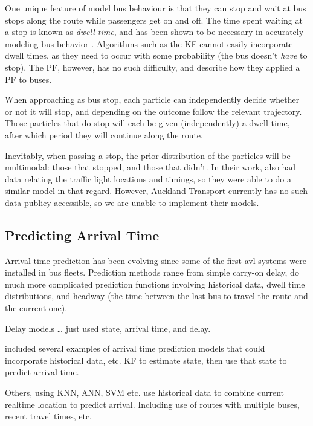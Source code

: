 \documentclass[12pt,a4paper]{article}
\begin{document}
One unique feature of model bus behaviour is that they can stop and wait at bus stops along the route
while passengers get on and off.
The time spent waiting at a stop is known as \emph{dwell time},
and has been shown to be necessary in accurately modeling bus behavior \citep{cn}.
Algorithms such as the KF cannot easily incorporate dwell times,
as they need to occur with some probability (the bus doesn't \emph{have} to stop).
The PF, however, has no such difficulty,
and \cite{hans-etal:2015} describe how they applied a PF to buses.


When approaching as bus stop,
each particle can independently decide whether or not it will stop,
and depending on the outcome follow the relevant trajectory.
Those particles that do stop will each be given (independently)
a dwell time, after which period they will continue along the route.

Inevitably, when passing a stop, the prior distribution of the particles will be multimodal:
those that stopped, and those that didn't.
In their work, \cite{hans-etal:2015} also had data relating the traffic light locations and
timings, so they were able to do a similar model in that regard.
However, Auckland Transport currently has no such data publicy accessible,
so we are unable to implement their models.



\subsection{Predicting Arrival Time}
\label{sec:arrivaltimeprediction}

Arrival time prediction has been evolving since some of the first \gls{avl}
systems were installed in bus fleets.
Prediction methods range from simple carry-on delay,
do much more complicated prediction functions involving historical data,
dwell time distributions, 
and headway (the time between the last bus to travel the route and the current one).


Delay models \ldots
\cite{dailey:2001} just used state, arrival time, and delay.


\cite{cathey-dailey:2003} included several examples of arrival time prediction models
that could incorporate historical data, etc.
KF to estimate state, then use that state to predict arrival time.


Others, using KNN, ANN, SVM etc. use historical data to combine current
realtime location to predict arrival.
Including use of routes with multiple buses, recent travel times, etc.
\end{document}
